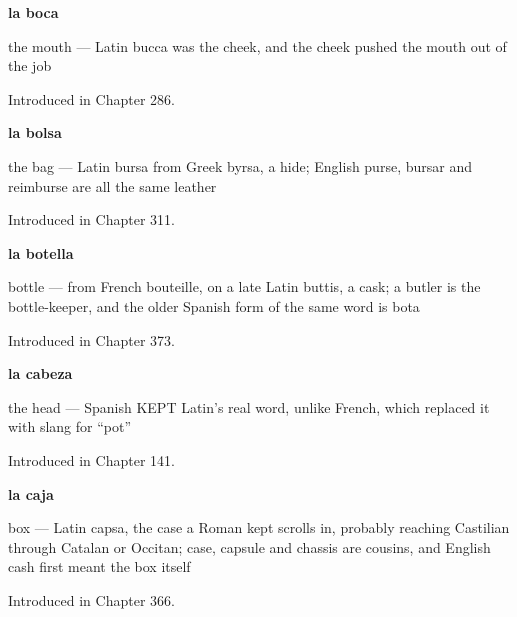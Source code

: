 \noindent\begin{minipage}[t]{\linewidth}
\raggedright
\textbf{la boca}\par
\small the mouth — Latin bucca was the cheek, and the cheek pushed the mouth out of the job\par
\footnotesize Introduced in Chapter 286.
\end{minipage}\par\medskip

\noindent\begin{minipage}[t]{\linewidth}
\raggedright
\textbf{la bolsa}\par
\small the bag — Latin bursa from Greek byrsa, a hide; English purse, bursar and reimburse are all the same leather\par
\footnotesize Introduced in Chapter 311.
\end{minipage}\par\medskip

\noindent\begin{minipage}[t]{\linewidth}
\raggedright
\textbf{la botella}\par
\small bottle — from French bouteille, on a late Latin buttis, a cask; a butler is the bottle-keeper, and the older Spanish form of the same word is bota\par
\footnotesize Introduced in Chapter 373.
\end{minipage}\par\medskip

\noindent\begin{minipage}[t]{\linewidth}
\raggedright
\textbf{la cabeza}\par
\small the head — Spanish KEPT Latin's real word, unlike French, which replaced it with slang for \textquotedblleft{}pot\textquotedblright{}\par
\footnotesize Introduced in Chapter 141.
\end{minipage}\par\medskip

\noindent\begin{minipage}[t]{\linewidth}
\raggedright
\textbf{la caja}\par
\small box — Latin capsa, the case a Roman kept scrolls in, probably reaching Castilian through Catalan or Occitan; case, capsule and chassis are cousins, and English cash first meant the box itself\par
\footnotesize Introduced in Chapter 366.
\end{minipage}\par\medskip

